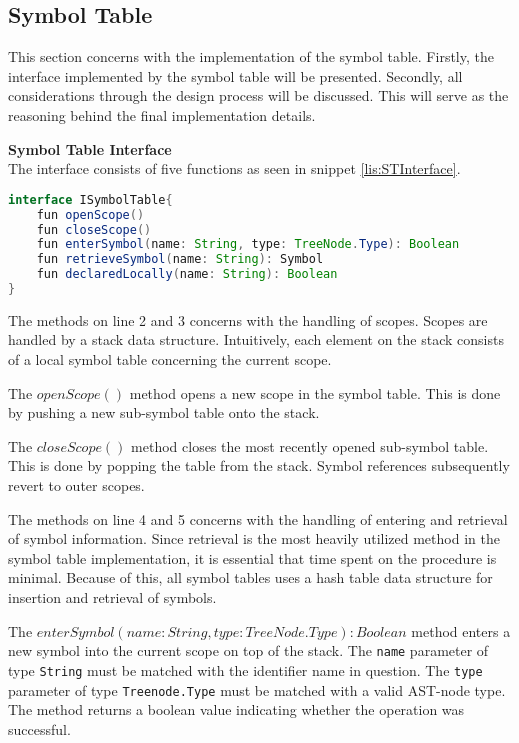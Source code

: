 \subsection{Symbol Table}
\label{sec:symbolTable}
This section concerns with the implementation of the symbol table. 
Firstly, the interface implemented by the symbol table will be presented.
Secondly, all considerations through the design process will be discussed.
This will serve as the reasoning behind the final implementation details.

\textbf{Symbol Table Interface}\\
The interface consists of five functions as seen in snippet \ref{lis:STInterface}.

\begin{lstlisting}[language=java,label=lis:STInterface,caption=The interface which all symbol table implementations must implement.]
interface ISymbolTable{
	fun openScope()
	fun closeScope()
	fun enterSymbol(name: String, type: TreeNode.Type): Boolean
	fun retrieveSymbol(name: String): Symbol
	fun declaredLocally(name: String): Boolean
}
\end{lstlisting}

The methods on line 2 and 3 concerns with the handling of scopes.
Scopes are handled by a stack data structure.
Intuitively, each element on the stack consists of a local symbol table concerning the current scope.

The $openScope()$ method opens a new scope in the symbol table.
This is done by pushing a new sub-symbol table onto the stack.

The $closeScope()$ method closes the most recently opened sub-symbol table.
This is done by popping the table from the stack.
Symbol references subsequently revert to outer scopes.

The methods on line 4 and 5 concerns with the handling of entering and retrieval of symbol information.
Since retrieval is the most heavily utilized method in the symbol table implementation, it is essential that time spent on the procedure is minimal.
Because of this, all symbol tables uses a hash table data structure for insertion and retrieval of symbols. 

The $enterSymbol(name: String, type: TreeNode.Type): Boolean$ method enters a new symbol into the current scope on top of the stack.
The \texttt{name} parameter of type \texttt{String} must be matched with the identifier name in question.
The \texttt{type} parameter of type \texttt{Treenode.Type} must be matched with a valid AST-node type.
The method returns a boolean value indicating whether the operation was successful.

